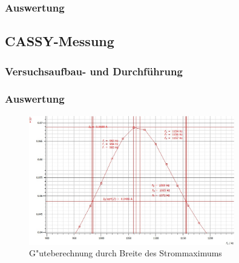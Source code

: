 \documentclass[12pt,a4paper]{article}
\begin{document}
\subsubsection{Auswertung}
\subsection{CASSY-Messung}
\subsubsection{Versuchsaufbau- und Durchführung}

\subsubsection{Auswertung}

\begin{figure}[H]
	\centering
	\includegraphics[width=0.8\textwidth]{Daten/S1Ohm_f0.jpg}
	\caption{G"uteberechnung durch Breite des Strommaximums}
	\label{S1Ohm_f0}
\end{figure}
\end{document}

